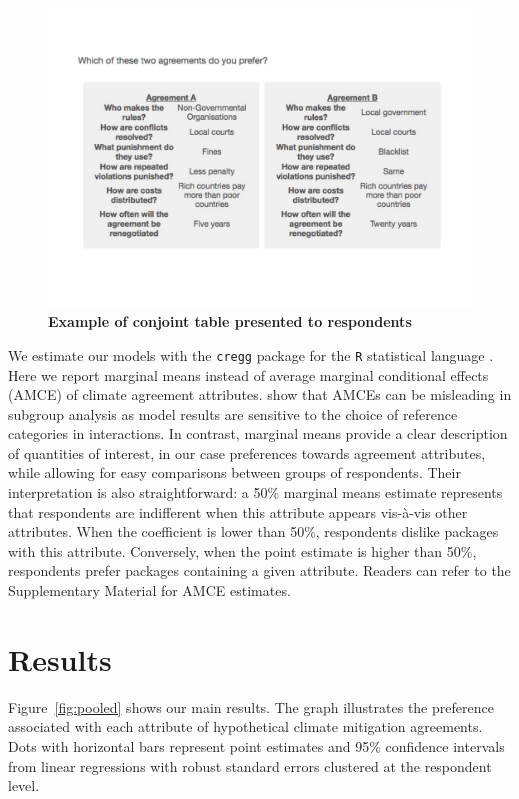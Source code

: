 \documentclass[a4paper,12pt]{article}
\begin{document}
\begin{figure}[H]
	\centering
	\includegraphics[width=15cm]{conjoint-cropped.pdf}
	\caption{\textbf{Example of conjoint table presented to respondents}}
	\label{fig:conjoint}
\end{figure}

We estimate our models with the \texttt{cregg} package \citep{leeper2018cregg} for the \texttt{R} statistical language \citep{rstats2019}. Here we report marginal means instead of average marginal conditional effects (AMCE) of climate agreement attributes. \citet{leeper2018subgroup} show that AMCEs can be misleading in subgroup analysis as model results are sensitive to the choice of reference categories in interactions. In contrast, marginal means provide a clear description of quantities of interest, in our case preferences towards agreement attributes, while allowing for easy comparisons between groups of respondents. Their interpretation is also straightforward: a 50\% marginal means estimate represents that respondents are indifferent when this attribute appears vis-\`{a}-vis other attributes. When the coefficient is lower than 50\%, respondents dislike packages with this attribute. Conversely, when the point estimate is higher than 50\%, respondents prefer packages containing a given attribute. Readers can refer to the Supplementary Material for AMCE estimates.

\section{Results}%
\label{sec:results}

Figure~\ref{fig:pooled} shows our main results. The graph illustrates the preference associated with each attribute of hypothetical climate mitigation agreements. Dots with horizontal bars represent point estimates and 95\% confidence intervals from linear regressions with robust standard errors clustered at the respondent level. \\
\end{document}
